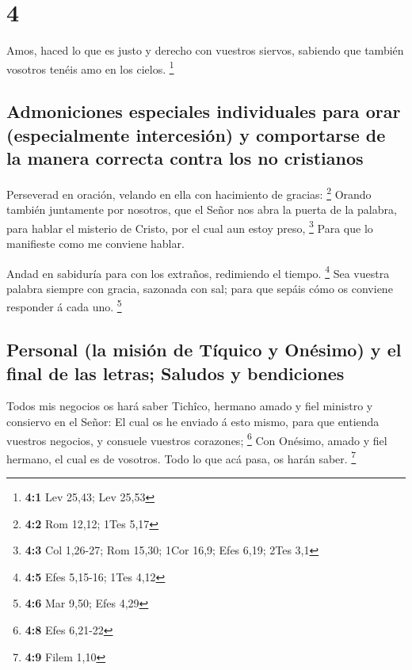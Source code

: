 \hypertarget{section-3}{%
\section{4}\label{section-3}}

 Amos, haced lo que es justo y derecho con vuestros
siervos, sabiendo que también vosotros tenéis amo en los cielos.
\footnote{\textbf{4:1} Lev 25,43; Lev 25,53}

\hypertarget{admoniciones-especiales-individuales-para-orar-especialmente-intercesiuxf3n-y-comportarse-de-la-manera-correcta-contra-los-no-cristianos}{%
\subsection{Admoniciones especiales individuales para orar
(especialmente intercesión) y comportarse de la manera correcta contra
los no
cristianos}\label{admoniciones-especiales-individuales-para-orar-especialmente-intercesiuxf3n-y-comportarse-de-la-manera-correcta-contra-los-no-cristianos}}

 Perseverad en oración, velando en ella con hacimiento de
gracias: \footnote{\textbf{4:2} Rom 12,12; 1Tes 5,17} 
Orando también juntamente por nosotros, que el Señor nos abra la puerta
de la palabra, para hablar el misterio de Cristo, por el cual aun estoy
preso, \footnote{\textbf{4:3} Col 1,26-27; Rom 15,30; 1Cor 16,9; Efes
  6,19; 2Tes 3,1}  Para que lo manifieste como me conviene
hablar.

 Andad en sabiduría para con los extraños, redimiendo el
tiempo. \footnote{\textbf{4:5} Efes 5,15-16; 1Tes 4,12} 
Sea vuestra palabra siempre con gracia, sazonada con sal; para que
sepáis cómo os conviene responder á cada uno. \footnote{\textbf{4:6} Mar
  9,50; Efes 4,29}

\hypertarget{personal-la-misiuxf3n-de-tuxedquico-y-onuxe9simo-y-el-final-de-las-letras-saludos-y-bendiciones}{%
\subsection{Personal (la misión de Tíquico y Onésimo) y el final de las
letras; Saludos y
bendiciones}\label{personal-la-misiuxf3n-de-tuxedquico-y-onuxe9simo-y-el-final-de-las-letras-saludos-y-bendiciones}}

 Todos mis negocios os hará saber Tichîco, hermano amado y
fiel ministro y consiervo en el Señor:  El cual os he
enviado á esto mismo, para que entienda vuestros negocios, y consuele
vuestros corazones; \footnote{\textbf{4:8} Efes 6,21-22} 
Con Onésimo, amado y fiel hermano, el cual es de vosotros. Todo lo que
acá pasa, os harán saber. \footnote{\textbf{4:9} Filem 1,10}

